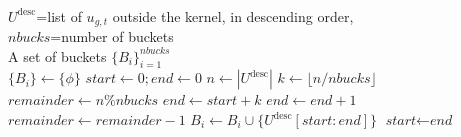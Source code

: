 \begin{algorithm}[htb]
\small%
\caption{\texttt{buildbuckets()}}
\label{alg:buildbuckets}
\begin{algorithmic}
\Require \\
$U^{\text{desc}}$=list of $u_{g,t}$ outside the kernel, in descending order, \\
$\textit{nbucks}$=number of buckets
\Ensure \\A set of buckets $\{ B_i\}_{i=1}^{\textit{nbucks}}$\\
\State $\{ B_i\}   \leftarrow \lbrace\phi\rbrace$
\State $\textit{start}      \leftarrow 0 ; \textit{end}  \leftarrow 0$
\State $n                \leftarrow |U^{\text{desc}}|$
\State $k                \leftarrow \lfloor n / \textit{nbucks}\rfloor$
\State $\textit{remainder} \leftarrow n \% \textit{nbucks}$ 
        \State $\textit{end} \leftarrow \textit{start} + k$
            \State $ \textit{end}       \leftarrow \textit{end} + 1$
            \State $ \textit{remainder} \leftarrow \textit{remainder} - 1$
        \EndIf            
        \State $ B_i\leftarrow  B_i\cup \lbrace U^{\text{desc}}[\textit{start}:\textit{end}]\rbrace$
        \State $\textit{start} \leftarrow  \textit{end} $
\EndFor\\
\end{algorithmic}
\end{algorithm}        


